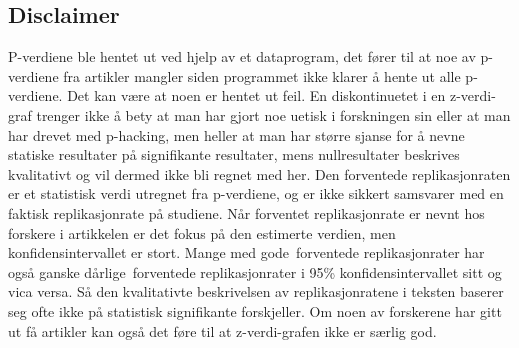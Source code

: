 \documentclass[doc,norsk]{apa7}
\begin{document}
\subsection{Disclaimer}
P-verdiene ble hentet ut ved hjelp av et dataprogram, det fører til at noe av p-verdiene fra artikler mangler siden programmet ikke klarer å hente ut alle p-verdiene. Det kan være at noen er hentet ut feil. En diskontinuetet i en z-verdi-graf trenger ikke å bety at man har gjort noe uetisk i forskningen sin eller at man har drevet med p-hacking, men heller at man har større sjanse for å nevne statiske resultater på signifikante resultater, mens nullresultater beskrives kvalitativt og vil dermed ikke bli regnet med her. Den forventede replikasjonraten er et statistisk verdi utregnet fra p-verdiene, og er ikke sikkert samsvarer med en faktisk replikasjonrate på studiene. Når forventet replikasjonrate er nevnt hos forskere i artikkelen er det fokus på den estimerte verdien, men konfidensintervallet er stort. Mange med \guillemetleft gode\guillemetright\ forventede replikasjonrater har også ganske \guillemetleft dårlige\guillemetright\ forventede replikasjonrater i 95\% konfidensintervallet sitt og vica versa. Så den kvalitativte beskrivelsen av replikasjonratene i teksten baserer seg ofte ikke på statistisk signifikante forskjeller. Om noen av forskerene har gitt ut få artikler kan også det føre til at z-verdi-grafen ikke er særlig god.

\printbibliography

\processdelayedfloats
\end{document}
